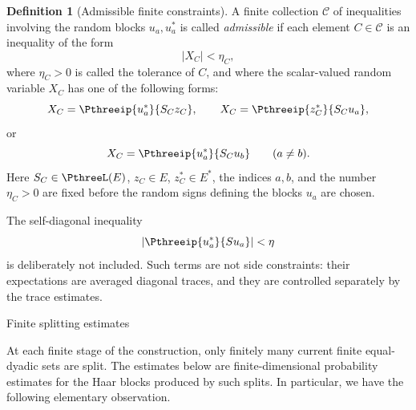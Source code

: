 \documentclass[11pt,reqno]{amsart}
\makeatletter
\theoremstyle{plain}
\theoremstyle{definition}
\newtheorem{definition}[definition]{Definition}
\newcounter{problempaper}
\newenvironment{problempaperbody}{%
  \setcounter{subsection}{0}%
  \setcounter{subsubsection}{0}%
  \setcounter{paragraph}{0}%
  \renewcommand{\thesubsection}{\arabic{subsection}}%
  \renewcommand{\thesubsubsection}{\thesubsection.\arabic{subsubsection}}%
  \renewcommand{\theparagraph}{\thesubsubsection.\arabic{paragraph}}%
  \let\problem@outersection\section
  \let\problem@outersubsection\subsection
  \let\problem@outersubsubsection\subsubsection
  \let\problem@outerparagraph\paragraph
  \let\section\problem@papersection
  \let\subsection\problem@papersubsection
  \let\subsubsection\problem@papersubsubsection
}{%
  \let\section\problem@outersection
  \let\subsection\problem@outersubsection
  \let\subsubsection\problem@outersubsubsection
  \let\paragraph\problem@outerparagraph
}
\newcommand{\problem@target}[2]{%
  \hypertarget{problem-\theproblempaper-#1-#2}{}%
}
\newcommand{\problem@paperheading}[3]{%
  \par\bigskip
  \problem@target{#1}{#2}%
  \noindent{\large\bfseries #2.\quad #3\par}%
  \nobreak\smallskip
}
\newcommand{\problem@papersubheading}[3]{%
  \par\medskip
  \problem@target{#1}{#2}%
  \noindent{\normalsize\bfseries #2.\quad #3\par}%
  \nobreak\smallskip
}
\newcommand{\problem@papersubsubheading}[3]{%
  \par\smallskip
  \problem@target{#1}{#2}%
  \noindent{\normalsize\itshape #2.\quad #3.\ }%
}
\def\problem@papersection{%
  \@ifstar{\problem@papersectionstar}{\problem@papersectionnostar}%
}
\def\problem@papersectionstar#1{%
  \par\bigskip\noindent{\large\bfseries #1\par}\nobreak\smallskip
}
\def\problem@papersectionnostar#1{%
  \refstepcounter{subsection}%
  \setcounter{subsubsection}{0}%
  \setcounter{paragraph}{0}%
  \problem@paperheading{section}{\thesubsection}{#1}%
  \problem@writecontentsline{section}{\thesubsection}{#1}%
}
\def\problem@papersubsection{%
  \@ifstar{\problem@papersubsectionstar}{\problem@papersubsectionnostar}%
}
\def\problem@papersubsectionstar#1{%
  \par\medskip\noindent{\normalsize\bfseries #1\par}\nobreak\smallskip
}
\def\problem@papersubsectionnostar#1{%
  \refstepcounter{subsubsection}%
  \setcounter{paragraph}{0}%
  \problem@papersubheading{subsection}{\thesubsubsection}{#1}%
  \problem@writecontentsline{subsection}{\thesubsubsection}{#1}%
}
\def\problem@papersubsubsection{%
  \@ifstar{\problem@papersubsubsectionstar}{\problem@papersubsubsectionnostar}%
}
\def\problem@papersubsubsectionstar#1{%
  \par\smallskip\noindent{\normalsize\itshape #1.\ }%
}
\def\problem@papersubsubsectionnostar#1{%
  \refstepcounter{paragraph}%
  \problem@papersubsubheading{subsubsection}{\theparagraph}{#1}%
  \problem@writecontentsline{subsubsection}{\theparagraph}{#1}%
}
\newcommand{\problem@writecontentsline}[3]{%
  \begingroup
  \protected@write\@auxout{}{%
    \string\problemcontentsentry{\theproblempaper}{#1}{#2}{#3}{\thepage}%
  }%
  \endgroup
}
\newcommand{\problemcontentsentry}[5]{%
  \@ifundefined{problemcontents@#1}{%
    \expandafter\gdef\csname problemcontents@#1\endcsname{}%
  }{}%
  \expandafter\g@addto@macro\csname problemcontents@#1\endcsname{%
    \problemcontentsline{#1}{#2}{#3}{#4}{#5}%
  }%
}
\newcommand{\problemcontentslink}[4]{%
  \hyperlink{problem-#1-#2-#3}{#4}%
}
\newcommand{\problemcontentsline}[5]{%
  \ifstrequal{#2}{section}{%
    \par\noindent
    \problemcontentslink{#1}{#2}{#3}{\makebox[2.5em][l]{#3}#4}%
    \nobreak\dotfill
    \problemcontentslink{#1}{#2}{#3}{#5}\par
  }{%
    \ifstrequal{#2}{subsection}{%
      \par\noindent\hspace*{1.5em}%
      \problemcontentslink{#1}{#2}{#3}{\makebox[3.5em][l]{#3}#4}%
      \nobreak\dotfill
      \problemcontentslink{#1}{#2}{#3}{#5}\par
    }{%
      \par\noindent\hspace*{3em}%
      \problemcontentslink{#1}{#2}{#3}{\makebox[4.5em][l]{#3}#4}%
      \nobreak\dotfill
      \problemcontentslink{#1}{#2}{#3}{#5}\par
    }%
  }%
}
\makeatother
\begin{document}
\begin{problempaperbody}
\begin{definition}[Admissible finite constraints]
A finite collection $\mathscr C$ of inequalities involving the random blocks $u_a,u_a^*$ is called \emph{admissible} if each element $C\in\mathscr C$ is an inequality of the form
\begin{equation*}
        |X_C|<\eta_C,
\end{equation*}
where $\eta_C>0$ is called the tolerance of $C$, and where the scalar-valued random variable $X_C$ has one of the following forms:
\begin{equation*}
        X_C=\Pthreeip{u_a^*}{S_Cz_C},\qquad X_C=\Pthreeip{z_C^*}{S_Cu_a},
\end{equation*}
or
\begin{equation*}
        X_C=\Pthreeip{u_a^*}{S_Cu_b}\qquad(a\ne b).
\end{equation*}
Here $S_C\in\PthreeL(E)$, $z_C\in E$, $z_C^*\in E^*$, the indices $a,b$, and the number $\eta_C>0$ are fixed before the random signs defining the blocks $u_a$ are chosen.
\end{definition}

The self-diagonal inequality
\begin{equation*}
        |\Pthreeip{u_a^*}{Su_a}|<\eta
\end{equation*}
is deliberately not included. Such terms are not side constraints: their expectations are averaged diagonal traces, and they are controlled separately by the trace estimates.


\section{Finite splitting estimates}
\label{p3:sec:finite-splitting}

At each finite stage of the construction, only finitely many current finite equal-dyadic sets are split. The estimates below are finite-dimensional probability estimates for the Haar blocks produced by such splits. In particular, we have the following elementary observation.


\end{problempaperbody}
\end{document}
